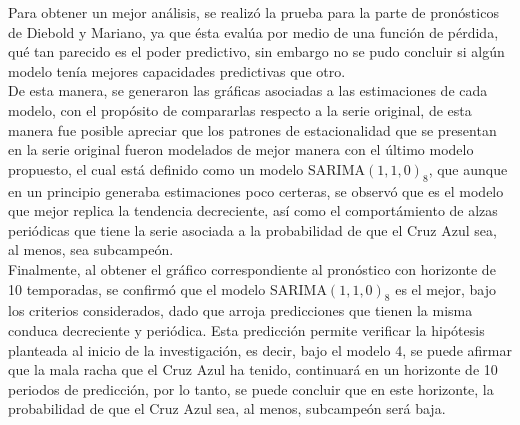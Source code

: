 \documentclass{article}
\theoremstyle{remark}
\begin{document}
Para obtener un mejor análisis, se realizó la prueba para la parte de pronósticos de Diebold y Mariano, ya que ésta evalúa por medio de una función de pérdida, qué tan parecido es el poder predictivo, sin embargo no se pudo concluir si algún modelo tenía mejores capacidades predictivas que otro. \\

De esta manera, se generaron las gráficas asociadas a las estimaciones de cada modelo, con el propósito de compararlas respecto a la serie original, de esta manera fue posible apreciar que los patrones de estacionalidad que se presentan en la serie original fueron modelados de mejor manera con el último modelo propuesto, el cual está definido como un modelo SARIMA$(1,1,0)_8$, que aunque en un principio generaba estimaciones poco certeras, se observó que es el modelo que mejor replica la tendencia decreciente, así como el comportámiento de alzas periódicas que tiene la serie asociada a la probabilidad de que el Cruz Azul sea, al menos, sea subcampeón.\\

Finalmente, al obtener el gráfico correspondiente al pronóstico con horizonte de 10 temporadas, se confirmó que el modelo  SARIMA$(1,1,0)_8$ es el mejor, bajo los criterios considerados, dado que arroja predicciones que tienen la misma conduca decreciente y periódica. Esta predicción permite verificar la hipótesis planteada al inicio de la investigación, es decir, bajo el modelo 4, se puede afirmar que la mala racha que el Cruz Azul ha tenido, continuará en un horizonte de 10 periodos de predicción, por lo tanto, se puede concluir que en este horizonte, la probabilidad de que el Cruz Azul sea, al menos, subcampeón será baja.
\end{document}
